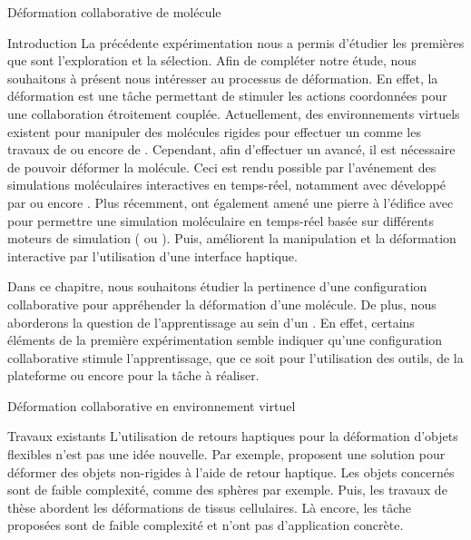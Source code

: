 \documentclass[myfrancais,ngerman,english,french]{mythesis}
\begin{document}
	\begin{mychapter}{Déformation collaborative de molécule}
		\begin{mysection}{Introduction}
			La précédente expérimentation nous a permis d'étudier les premières  que sont l'exploration et la sélection.
			Afin de compléter notre étude, nous souhaitons à présent nous intéresser au processus de déformation.
			En effet, la déformation est une tâche permettant de stimuler les actions coordonnées pour une collaboration étroitement couplée.
			Actuellement, des environnements virtuels existent pour manipuler des molécules rigides pour effectuer un  comme les travaux de  ou encore de .
			Cependant, afin d'effectuer un  avancé, il est nécessaire de pouvoir déformer la molécule.
			Ceci est rendu possible par l'avénement des simulations moléculaires interactives en temps-réel, notamment avec  développé par  ou encore .
			Plus récemment,  ont également amené une pierre à l'édifice avec \myMDDriver pour permettre une simulation moléculaire en temps-réel basée sur différents moteurs de simulation ( ou \myGromacs).
			Puis,  améliorent la manipulation et la déformation interactive par l'utilisation d'une interface haptique.

			Dans ce chapitre, nous souhaitons étudier la pertinence d'une configuration collaborative pour appréhender la déformation d'une molécule.
			De plus, nous aborderons la question de l'apprentissage au sein d'un .
			En effet, certains éléments de la première expérimentation semble indiquer qu'une configuration collaborative stimule l'apprentissage, que ce soit pour l'utilisation des outils, de la plateforme ou encore pour la tâche à réaliser.
		\end{mysection}
		\begin{mysection}{Déformation collaborative en environnement virtuel}
			\begin{mysubsection}{Travaux existants}
				L'utilisation de retours haptiques pour la déformation d'objets flexibles n'est pas une idée nouvelle.
				Par exemple,  proposent une solution pour déformer des objets non-rigides à l'aide de retour haptique.
				Les objets concernés sont de faible complexité, comme des sphères par exemple.
				Puis, les travaux de thèse  abordent les déformations de tissus cellulaires.
				Là encore, les tâche proposées sont de faible complexité et n'ont pas d'application concrète.


\end{mysubsection}
\end{mysection}
\end{mychapter}
\end{document}
